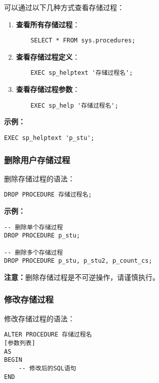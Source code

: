 \qquad 可以通过以下几种方式查看存储过程：

\begin{enumerate}
\item \textbf{查看所有存储过程}：
    \begin{verbatim}
    SELECT * FROM sys.procedures;
    \end{verbatim}

\item \textbf{查看存储过程定义}：
    \begin{verbatim}
    EXEC sp_helptext '存储过程名';
    \end{verbatim}

\item \textbf{查看存储过程参数}：
    \begin{verbatim}
    EXEC sp_help '存储过程名';
    \end{verbatim}
\end{enumerate}

\textbf{示例：}
\begin{verbatim}
EXEC sp_helptext 'p_stu';
\end{verbatim}

\subsubsection{删除用户存储过程}

\qquad 删除存储过程的语法：

\begin{mdframed}[backgroundcolor=gray!10]
\begin{verbatim}
DROP PROCEDURE 存储过程名;
\end{verbatim}
\end{mdframed}

\textbf{示例：}
\begin{verbatim}
-- 删除单个存储过程
DROP PROCEDURE p_stu;

-- 删除多个存储过程
DROP PROCEDURE p_stu, p_stu2, p_count_cs;
\end{verbatim}

\textbf{注意：}删除存储过程是不可逆操作，请谨慎执行。

\subsubsection{修改存储过程}

\qquad 修改存储过程的语法：

\begin{mdframed}[backgroundcolor=gray!10]
\begin{verbatim}
ALTER PROCEDURE 存储过程名
[参数列表]
AS
BEGIN
    -- 修改后的SQL语句
END
\end{verbatim}
\end{mdframed}

